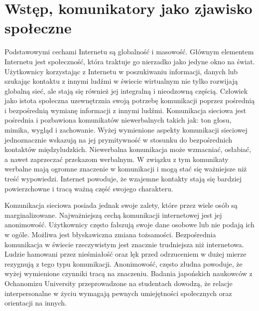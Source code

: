 \documentclass[a4paper,12pt]{article}
\begin{document}
\section[Wstęp, komunikatory jako zjawisko społeczne]{Wstęp, komunikatory jako zjawisko społeczne}
Podstawowymi cechami Internetu są globalność i masowość.
Głównym elementem Internetu jest społeczność, która traktuje go nierzadko jako jedyne okno na świat.
Użytkownicy korzystając z Internetu w poszukiwaniu informacji, danych lub szukając kontaktu z innymi ludźmi w świecie wirtualnym nie tylko rozwijają globalną sieć, ale stają się również jej integralną i nieodzowną częścią.
Człowiek jako istota społeczna uzewnętrznia swoją potrzebę komunikacji poprzez pośrednią i bezpośrednią wymianę informacji z innymi ludźmi. Komunikacja sieciowa jest pośrednia i pozbawiona komunikatów niewerbalnych takich jak:
ton głosu, mimika, wygląd i zachowanie. Wyżej wymienione aspekty komunikacji sieciowej jednoznacznie wskazują na jej prymitywność w stosunku do bezpośrednich kontaktów międzyludzkich. Niewerbalna komunikacja może wzmacniać, osłabiać, a nawet zaprzeczać przekazom werbalnym. W związku z tym komunikaty werbalne mają ogromne znaczenie w komunikacji i mogą stać się ważniejsze niż treść wypowiedzi. Internet powoduje, że wzajemne kontakty stają się bardziej powierzchowne i tracą ważną część swojego charakteru.

\par Komunikacja sieciowa posiada jednak swoje zalety, które przez wiele osób są marginalizowane.
Najważniejszą cechą komunikacji internetowej jest jej anonimowość. Użytkownicy często fałszują swoje dane osobowe lub nie podają ich w ogóle. Możliwa jest błyskawiczna zmiana tożsamości. Bezpośrednia komunikacja w świecie rzeczywistym jest znacznie trudniejsza niż internetowa. Ludzie hamowani przez nieśmiałość oraz lęk przed odrzuceniem w dużej mierze rezygnują z tego typu komunikacji. Anonimowość, często złudna powoduje, że wyżej wymienione czynniki tracą na znaczeniu. Badania japońskich naukowców z Ochanomizu University przeprowadzone na studentach dowodzą, że relacje interpersonalne w życiu wymagają pewnych umiejętności społecznych oraz orientacji na innych.
\end{document}
